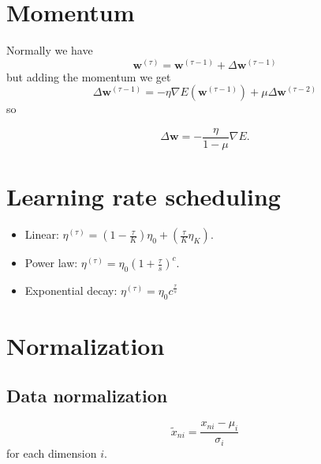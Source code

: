 \documentclass[a4paper,9pt]{extarticle}
\begin{document}
\begin{multicols*}{2}
		\section{Momentum}
		Normally we have 
		\begin{equation*}
			\mathbf{w}^{(\tau)}=\mathbf{w}^{(\tau-1)}+\Delta\mathbf{w}^{(\tau-1)}
		\end{equation*}
		but adding the momentum we get
		\begin{equation*}
			\Delta\mathbf{w}^{(\tau-1)}=-\eta\nabla E(\mathbf{w}^{(\tau-1)})+\mu\Delta\mathbf{w}^{(\tau-2)}
		\end{equation*}
		so \begin{riquadro}
			\begin{equation*}
			\Delta\mathbf{w}=-\frac{\eta}{1-\mu}\nabla E.
		\end{equation*}
		\end{riquadro}
		\section{Learning rate scheduling}
		\begin{itemize}
			\item Linear: $\eta^{(\tau)}=(1-\frac{\tau}{K})\eta_{0}+(\frac{\tau}{K}\eta_{K})$.
			\item Power law: $\eta^{(\tau)}=\eta_{0}(1+\frac{\tau}{s})^{c}$.
			\item Exponential decay: $\eta^{(\tau)}=\eta_{0}c^{\frac{\tau}{s}}$
		\end{itemize}
		\section{Normalization}
		\subsection{Data normalization}
		\begin{riquadro}
			\begin{equation*}
				\tilde{x}_{ni}=\frac{x_{ni}-\mu_{i}}{\sigma_{i}}
			\end{equation*}
			for each dimension $i$.
		\end{riquadro}

\end{multicols*}
\end{document}
